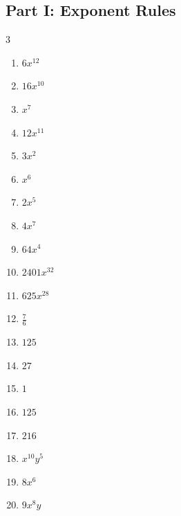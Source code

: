 \documentclass[11pt]{article}
\begin{document}
\subsection*{Part I: Exponent Rules}
\begin{multicols}{3}
\begin{enumerate}
  \item $6 x^{12}$
  \item $16 x^{10}$
  \item $x^{7}$
  \item $12 x^{11}$
  \item $3 x^{2}$
  \item $x^{6}$
  \item $2 x^{5}$
  \item $4 x^{7}$
  \item $64 x^{4}$
  \item $2401 x^{32}$
  \item $625 x^{28}$
  \item $\frac{7}{6}$
  \item $125$
  \item $27$
  \item $1$
  \item $125$
  \item $216$
  \item $x^{10} y^{5}$
  \item $8 x^{6}$
  \item $9 x^{8} y$
\end{enumerate}
\end{multicols}
\end{document}
